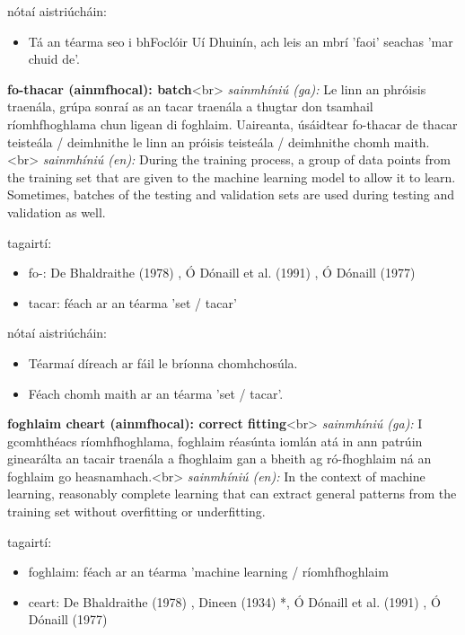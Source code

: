 \documentclass{article}
\begin{document}
nótaí aistriúcháin:
\begin{itemize}
	\item Tá an téarma seo i bhFoclóir Uí Dhuinín, ach leis an mbrí 'faoi' seachas 'mar chuid de'.
\end{itemize}


\textbf{fo-thacar (ainmfhocal): batch}<br>
\textit{sainmhíniú (ga):} Le linn an phróisis traenála, grúpa sonraí as an tacar traenála a thugtar don tsamhail ríomhfhoghlama chun ligean di foghlaim. Uaireanta, úsáidtear fo-thacar de thacar teisteála / deimhnithe le linn an próisis teisteála / deimhnithe chomh maith.<br>
\textit{sainmhíniú (en):} During the training process, a group of data points from the training set that are given to the machine learning model to allow it to learn. Sometimes, batches of the testing and validation sets are used during testing and validation as well.

tagairtí:
\begin{itemize}
	\item fo-: De Bhaldraithe (1978) \cite{de-bhaldraithe}, Ó Dónaill et al. (1991) \cite{focloir-beag}, Ó Dónaill (1977) \cite{odonaill}
	\item tacar: féach ar an téarma 'set / tacar'
\end{itemize}

nótaí aistriúcháin:
\begin{itemize}
	\item Téarmaí díreach ar fáil le bríonna chomhchosúla.
	\item Féach chomh maith ar an téarma 'set / tacar'.
\end{itemize}


\textbf{foghlaim cheart (ainmfhocal): correct fitting}<br>
\textit{sainmhíniú (ga):} I gcomhthéacs ríomhfhoghlama, foghlaim réasúnta iomlán atá in ann patrúin ginearálta an tacair traenála a fhoghlaim gan a bheith ag ró-fhoghlaim ná an foghlaim go heasnamhach.<br>
\textit{sainmhíniú (en):} In the context of machine learning, reasonably complete learning that can extract general patterns from the training set without overfitting or underfitting.

tagairtí:
\begin{itemize}
	\item foghlaim: féach ar an téarma 'machine learning / ríomhfhoghlaim
	\item ceart: De Bhaldraithe (1978) \cite{de-bhaldraithe}, Dineen (1934) \cite{dineen}*, Ó Dónaill et al. (1991) \cite{focloir-beag}, Ó Dónaill (1977) \cite{odonaill}
\end{itemize}
\end{document}
